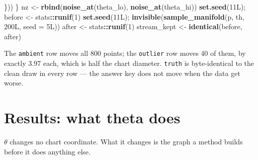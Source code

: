 \documentclass[
  british,
  a4paper,
]{book}
\newenvironment{Shaded}{\begin{snugshade}}{\end{snugshade}}
\newcommand{\AttributeTok}[1]{\textcolor[rgb]{0.13,0.29,0.53}{#1}}
\newcommand{\DataTypeTok}[1]{\textcolor[rgb]{0.13,0.29,0.53}{#1}}
\newcommand{\DecValTok}[1]{\textcolor[rgb]{0.00,0.00,0.81}{#1}}
\newcommand{\FunctionTok}[1]{\textcolor[rgb]{0.13,0.29,0.53}{\textbf{#1}}}
\newcommand{\NormalTok}[1]{#1}
\newcommand{\OtherTok}[1]{\textcolor[rgb]{0.56,0.35,0.01}{#1}}
\newcommand{\SpecialCharTok}[1]{\textcolor[rgb]{0.81,0.36,0.00}{\textbf{#1}}}
\begin{document}
\begin{Shaded}
\begin{Highlighting}[]
\NormalTok{  \}))}
\NormalTok{\}}
\NormalTok{nz }\OtherTok{\textless{}{-}} \FunctionTok{rbind}\NormalTok{(}\FunctionTok{noise\_at}\NormalTok{(theta\_lo), }\FunctionTok{noise\_at}\NormalTok{(theta\_hi))}
\FunctionTok{set.seed}\NormalTok{(}\DecValTok{11}\DataTypeTok{L}\NormalTok{); before }\OtherTok{\textless{}{-}}\NormalTok{ stats}\SpecialCharTok{::}\FunctionTok{runif}\NormalTok{(}\DecValTok{1}\NormalTok{)}
\FunctionTok{set.seed}\NormalTok{(}\DecValTok{11}\DataTypeTok{L}\NormalTok{); }\FunctionTok{invisible}\NormalTok{(}\FunctionTok{sample\_manifold}\NormalTok{(p, th, }\DecValTok{200}\DataTypeTok{L}\NormalTok{, }\AttributeTok{seed =} \DecValTok{5}\DataTypeTok{L}\NormalTok{))}
\NormalTok{after }\OtherTok{\textless{}{-}}\NormalTok{ stats}\SpecialCharTok{::}\FunctionTok{runif}\NormalTok{(}\DecValTok{1}\NormalTok{)}
\NormalTok{stream\_kept }\OtherTok{\textless{}{-}} \FunctionTok{identical}\NormalTok{(before, after)}
\end{Highlighting}
\end{Shaded}

The \texttt{ambient} row moves all 800 points; the
\texttt{outlier} row moves 40 of them, by exactly
3.97 each, which is half the chart
diameter. \texttt{truth} is byte-identical to the clean draw in every row --- the answer
key does not move when the data get worse.

\section{Results: what theta does}\label{gen-results}

\(\theta\) changes no chart coordinate. What it changes is the graph a method
builds before it does anything else.
\end{document}

